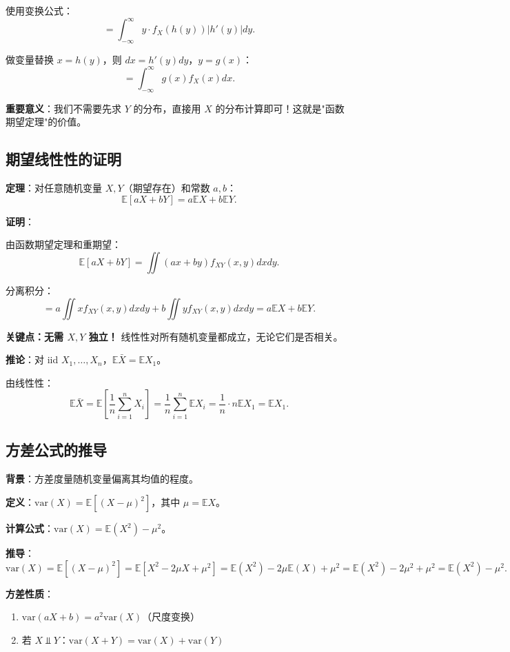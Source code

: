 使用变换公式：
\[
= \int_{-\infty}^{\infty} y \cdot f_X(h(y)) |h'(y)| dy.
\]

做变量替换 $x = h(y)$，则 $dx = h'(y) dy$，$y = g(x)$：
\[
= \int_{-\infty}^{\infty} g(x) f_X(x) dx.
\]

\textbf{重要意义}：我们不需要先求 $Y$ 的分布，直接用 $X$ 的分布计算即可！这就是"函数期望定理"的价值。

\subsection{期望线性性的证明}\label{sec:derivation-expectation-linear}

\textbf{定理}：对任意随机变量 $X, Y$（期望存在）和常数 $a, b$：
\[
\mathbb{E}[aX + bY] = a\mathbb{E}X + b\mathbb{E}Y.
\]

\textbf{证明}：

由函数期望定理和重期望：
\[
\mathbb{E}[aX + bY] = \iint (ax + by) f_{XY}(x,y) dx dy.
\]

分离积分：
\[
= a \iint x f_{XY}(x,y) dx dy + b \iint y f_{XY}(x,y) dx dy = a\mathbb{E}X + b\mathbb{E}Y.
\]

\textbf{关键点：无需 $X, Y$ 独立！} 线性性对所有随机变量都成立，无论它们是否相关。

\textbf{推论}：对 iid $X_1, \ldots, X_n$，$\mathbb{E}\bar{X} = \mathbb{E}X_1$。

由线性性：
\[
\mathbb{E}\bar{X} = \mathbb{E}\left[\frac{1}{n}\sum_{i=1}^n X_i\right] = \frac{1}{n}\sum_{i=1}^n \mathbb{E}X_i = \frac{1}{n} \cdot n \mathbb{E}X_1 = \mathbb{E}X_1.
\]

\subsection{方差公式的推导}\label{sec:derivation-variance-formula}

\textbf{背景}：方差度量随机变量偏离其均值的程度。

\textbf{定义}：$\text{var}(X) = \mathbb{E}[(X - \mu)^2]$，其中 $\mu = \mathbb{E}X$。

\textbf{计算公式}：$\text{var}(X) = \mathbb{E}(X^2) - \mu^2$。

\textbf{推导}：
\[
\text{var}(X) = \mathbb{E}[(X - \mu)^2] = \mathbb{E}[X^2 - 2\mu X + \mu^2] = \mathbb{E}(X^2) - 2\mu\mathbb{E}(X) + \mu^2 = \mathbb{E}(X^2) - 2\mu^2 + \mu^2 = \mathbb{E}(X^2) - \mu^2.
\]

\textbf{方差性质}：
\begin{enumerate}
\item $\text{var}(aX + b) = a^2 \text{var}(X)$（尺度变换）
\item 若 $X \Perp Y$：$\text{var}(X + Y) = \text{var}(X) + \text{var}(Y)$
\end{enumerate}

